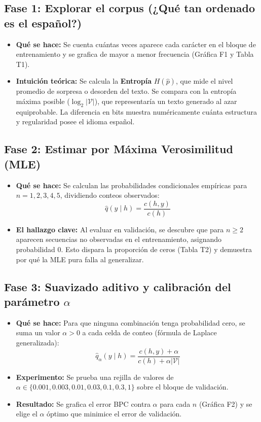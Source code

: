 \documentclass[11pt,letterpaper]{article}
\begin{document}
\subsection*{Fase 1: Explorar el corpus (¿Qué tan ordenado es el español?)}
\begin{itemize}[leftmargin=0.8cm, itemsep=1pt, parsep=0pt]
    \item \textbf{Qué se hace:} Se cuenta cuántas veces aparece cada carácter en el bloque de entrenamiento y se grafica de mayor a menor frecuencia (Gráfica F1 y Tabla T1).
    \item \textbf{Intuición teórica:} Se calcula la \textbf{Entropía} $H(\hat{p})$, que mide el nivel promedio de sorpresa o desorden del texto. Se compara con la entropía máxima posible ($\log_2 |\mathcal{V}|$), que representaría un texto generado al azar equiprobable. La diferencia en bits muestra numéricamente cuánta estructura y regularidad posee el idioma español.
\end{itemize}

\subsection*{Fase 2: Estimar por Máxima Verosimilitud (MLE)}
\begin{itemize}[leftmargin=0.8cm, itemsep=1pt, parsep=0pt]
    \item \textbf{Qué se hace:} Se calculan las probabilidades condicionales empíricas para $n = 1, 2, 3, 4, 5$, dividiendo conteos observados:
    \[
    \hat{q}(y \mid h) = \frac{c(h, y)}{c(h)}
    \]
    \item \textbf{El hallazgo clave:} Al evaluar en validación, se descubre que para $n \ge 2$ aparecen secuencias no observadas en el entrenamiento, asignando probabilidad 0. Esto dispara la proporción de ceros (Tabla T2) y demuestra por qué la MLE pura falla al generalizar.
\end{itemize}

\subsection*{Fase 3: Suavizado aditivo y calibración del parámetro $\alpha$}
\begin{itemize}[leftmargin=0.8cm, itemsep=1pt, parsep=0pt]
    \item \textbf{Qué se hace:} Para que ninguna combinación tenga probabilidad cero, se suma un valor $\alpha > 0$ a cada celda de conteo (fórmula de Laplace generalizada):
    \[
    \hat{q}_\alpha(y \mid h) = \frac{c(h, y) + \alpha}{c(h) + \alpha |\mathcal{V}|}
    \]
    \item \textbf{Experimento:} Se prueba una rejilla de valores de $\alpha \in \{0.001, 0.003, 0.01, 0.03, 0.1, 0.3, 1\}$ sobre el bloque de validación.
    \item \textbf{Resultado:} Se grafica el error BPC contra $\alpha$ para cada $n$ (Gráfica F2) y se elige el $\alpha$ óptimo que minimice el error de validación.
\end{itemize}
\end{document}
